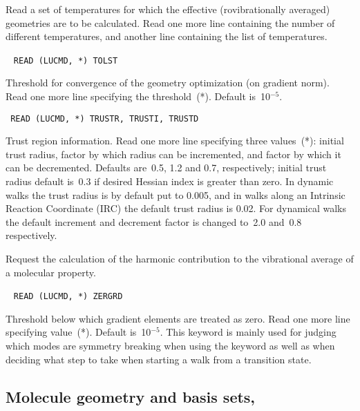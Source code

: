 \begin{description}
Read a set of temperatures for which the
effective (rovibrationally averaged) geometries are to be
calculated. Read one more line containing the number of different
temperatures, and another line containing the list of temperatures.

\item[\Key{TOLERANCE}]\verb| |\newline
\verb|READ (LUCMD, *) TOLST|

Threshold for convergence of the geometry optimization (on gradient
norm).  Read one more line specifying the threshold~(*).  Default
is~10$^{-5}$.

\item[\Key{TRUST}]\verb| |\newline
\verb|READ (LUCMD, *) TRUSTR, TRUSTI, TRUSTD|

Trust region information.  Read one more
line specifying three values~(*): initial trust radius, factor by
which radius can be incremented, and factor by which it can be
decremented.  Defaults are~0.5, 1.2 and 0.7, respectively; initial
trust radius default is~0.3 if desired Hessian index is
greater than zero. In dynamic walks the trust radius
is by default put
to 0.005, and in walks along an Intrinsic Reaction Coordinate
(IRC) the
default trust radius is 0.02. For dynamical walks the default
increment and decrement factor is changed to~2.0 and~0.8
respectively.

\item[\Key{VIBAVE}]
Request the calculation of the harmonic contribution to the
vibrational average of a molecular property.


\item[\Key{ZERGRD}]\verb| |\newline
\verb|READ (LUCMD, *) ZERGRD|

Threshold below which gradient elements are
treated as zero.  Read one more line specifying value~(*). Default
is~10$^{-5}$. This keyword is mainly used for judging which modes are
symmetry breaking when using the keyword  as well as
when deciding what step to take when starting a walk from a transition
state.
\end{description}

\subsection{Molecule geometry and basis sets, }\label{sec:herrdn}

